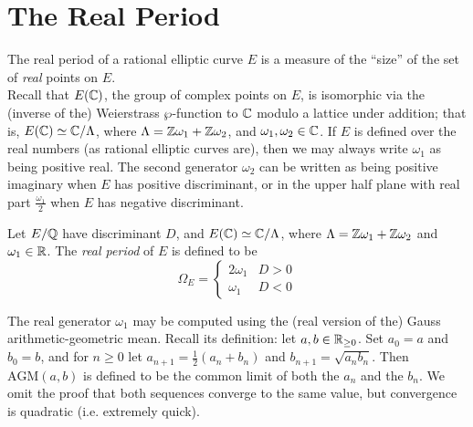 \documentclass[10pt]{article}
\newcommand{\AGM}{\text{AGM}}
\begin{document}
\newpage
\section{The Real Period}

The real period of a rational elliptic curve $E$ is a measure of the ``size'' of the set of {\it real} points on $E$. \\

Recall that $E(\mathbb{C})$, the group of complex points on $E$, is isomorphic via the (inverse of the) Weierstrass $\wp$-function to $\mathbb{C}$ modulo a lattice under addition; that is, $E(\mathbb{C}) \simeq \mathbb{C}/\Lambda$, where $\Lambda = \mathbb{Z}\omega_1 + \mathbb{Z}\omega_2$, and $\omega_1,\omega_2 \in \mathbb{C}$.
If $E$ is defined over the real numbers (as rational elliptic curves are), then we may always write $\omega_1$ as being positive real. The second generator $\omega_2$ can be written as being positive imaginary when $E$ has positive discriminant, or in the upper half plane with real part $\frac{\omega_1}{2}$ when $E$ has negative discriminant.

\begin{definition}
Let $E/\mathbb{Q}$ have discriminant $D$, and $E(\mathbb{C}) \simeq \mathbb{C}/\Lambda$, where $\Lambda = \mathbb{Z}\omega_1 + \mathbb{Z}\omega_2$ and $\omega_1 \in \mathbb{R}$. The {\it real period} of $E$ is defined to be
\begin{equation}
\Omega_E = \begin{cases} 2\omega_1 & D > 0 \\ \omega_1 & D < 0 \end{cases}
\end{equation}
\end{definition}

The real generator $\omega_1$ may be computed using the (real version of the) Gauss arithmetic-geometric mean. Recall its definition: let $a,b \in \mathbb{R}_{\ge0}$. Set $a_0 = a$ and $b_0 = b$, and for $n\ge 0$ let $a_{n+1} = \frac{1}{2}(a_{n}+b_{n})$ and $b_{n+1} = \sqrt{a_{n}b_{n}}$. Then $\AGM(a,b)$ is defined to be the common limit of both the $a_n$ and the $b_n$. We omit the proof that both sequences converge to the same value, but convergence is quadratic (i.e. extremely quick).
\end{document}

